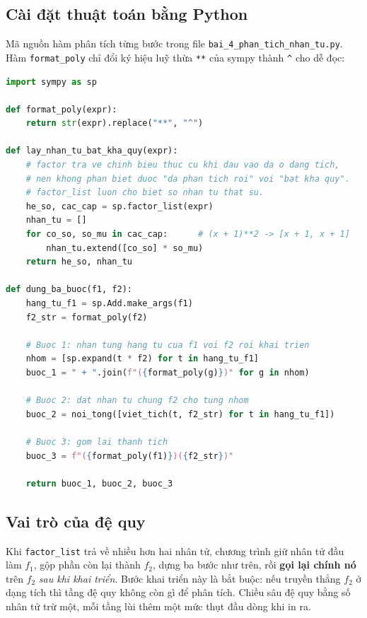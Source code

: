 \documentclass[12pt,a4paper]{article}
\begin{document}
\subsection{Cài đặt thuật toán bằng Python}
\begin{sloppypar}
Mã nguồn hàm phân tích từng bước trong file \texttt{bai\_4\_phan\_tich\_nhan\_tu.py}. Hàm \texttt{format\_poly} chỉ đổi ký hiệu luỹ thừa \texttt{**} của sympy thành \texttt{\^{}} cho dễ đọc:
\end{sloppypar}
\begin{lstlisting}[language=Python]
import sympy as sp

def format_poly(expr):
    return str(expr).replace("**", "^")

def lay_nhan_tu_bat_kha_quy(expr):
    # factor tra ve chinh bieu thuc cu khi dau vao da o dang tich,
    # nen khong phan biet duoc "da phan tich roi" voi "bat kha quy".
    # factor_list luon cho biet so nhan tu that su.
    he_so, cac_cap = sp.factor_list(expr)
    nhan_tu = []
    for co_so, so_mu in cac_cap:      # (x + 1)**2 -> [x + 1, x + 1]
        nhan_tu.extend([co_so] * so_mu)
    return he_so, nhan_tu

def dung_ba_buoc(f1, f2):
    hang_tu_f1 = sp.Add.make_args(f1)
    f2_str = format_poly(f2)

    # Buoc 1: nhan tung hang tu cua f1 voi f2 roi khai trien
    nhom = [sp.expand(t * f2) for t in hang_tu_f1]
    buoc_1 = " + ".join(f"({format_poly(g)})" for g in nhom)

    # Buoc 2: dat nhan tu chung f2 cho tung nhom
    buoc_2 = noi_tong([viet_tich(t, f2_str) for t in hang_tu_f1])

    # Buoc 3: gom lai thanh tich
    buoc_3 = f"({format_poly(f1)})({f2_str})"

    return buoc_1, buoc_2, buoc_3
\end{lstlisting}

\subsection{Vai trò của đệ quy}
Khi \texttt{factor\_list} trả về nhiều hơn hai nhân tử, chương trình giữ nhân tử đầu làm $f_1$, gộp phần còn lại thành $f_2$, dựng ba bước như trên, rồi \textbf{gọi lại chính nó} trên $f_2$ \emph{sau khi khai triển}. Bước khai triển này là bắt buộc: nếu truyền thẳng $f_2$ ở dạng tích thì tầng đệ quy không còn gì để phân tích. Chiều sâu đệ quy bằng số nhân tử trừ một, mỗi tầng lùi thêm một mức thụt đầu dòng khi in ra.
\end{document}
